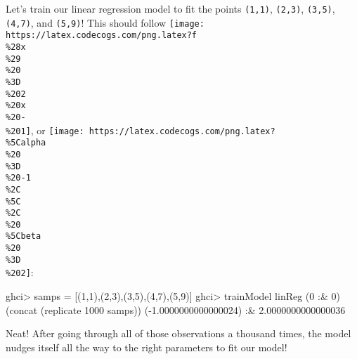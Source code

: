 \documentclass[]{article}
\newenvironment{Shaded}{}{}
\newcommand{\CommentTok}[1]{\textcolor[rgb]{0.38,0.63,0.69}{\textit{#1}}}
\newcommand{\DataTypeTok}[1]{\textcolor[rgb]{0.56,0.13,0.00}{#1}}
\newcommand{\DecValTok}[1]{\textcolor[rgb]{0.25,0.63,0.44}{#1}}
\newcommand{\FloatTok}[1]{\textcolor[rgb]{0.25,0.63,0.44}{#1}}
\newcommand{\FunctionTok}[1]{\textcolor[rgb]{0.02,0.16,0.49}{#1}}
\newcommand{\NormalTok}[1]{#1}
\newcommand{\OtherTok}[1]{\textcolor[rgb]{0.00,0.44,0.13}{#1}}
\begin{document}
\begin{Shaded}
\end{Shaded}

Let's train our linear regression model to fit the points \texttt{(1,1)},
\texttt{(2,3)}, \texttt{(3,5)}, \texttt{(4,7)}, and \texttt{(5,9)}! This should
follow
\texttt{[image: https://latex.codecogs.com/png.latex?f\\\%28x\\\%29\\\%20\\\%3D\\\%202\\\%20x\\\%20-\\\%201]},
or
\texttt{[image: https://latex.codecogs.com/png.latex?\\\%5Calpha\\\%20\\\%3D\\\%20-1\\\%2C\\\%5C\\\%2C\\\%20\\\%5Cbeta\\\%20\\\%3D\\\%202]}:

\begin{Shaded}
\begin{Highlighting}[]
\NormalTok{ghci}\FunctionTok{>}\NormalTok{ samps }\FunctionTok{=}\NormalTok{ [(}\DecValTok{1}\NormalTok{,}\DecValTok{1}\NormalTok{),(}\DecValTok{2}\NormalTok{,}\DecValTok{3}\NormalTok{),(}\DecValTok{3}\NormalTok{,}\DecValTok{5}\NormalTok{),(}\DecValTok{4}\NormalTok{,}\DecValTok{7}\NormalTok{),(}\DecValTok{5}\NormalTok{,}\DecValTok{9}\NormalTok{)]}
\NormalTok{ghci}\FunctionTok{>}\NormalTok{ trainModel linReg (}\DecValTok{0} \FunctionTok{:&} \DecValTok{0}\NormalTok{) (concat (replicate }\DecValTok{1000}\NormalTok{ samps))}
\NormalTok{(}\FunctionTok{-}\FloatTok{1.0000000000000024}\NormalTok{) }\FunctionTok{:&} \FloatTok{2.0000000000000036}
\end{Highlighting}
\end{Shaded}

Neat! After going through all of those observations a thousand times, the model
nudges itself all the way to the right parameters to fit our model!
\end{document}
